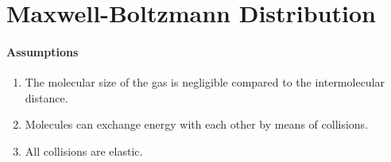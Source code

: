 \documentclass[12pt, oneside]{book}
\begin{document}
\section{Maxwell-Boltzmann Distribution}
\paragraph{Assumptions}
\begin{enumerate}
    \item The molecular size of the gas is negligible compared to the intermolecular distance.
    \item Molecules can exchange energy with each other by means of collisions.
    \item All collisions are elastic.
\end{enumerate}
\end{document}
